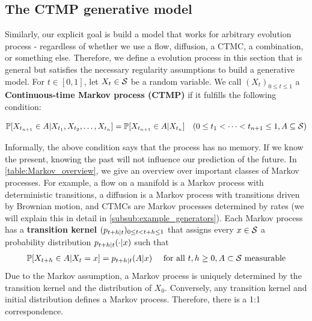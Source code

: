 \documentclass{fairmeta}
\newcommand{\highlight}[1]{{\color{metablue} \textbf{#1}}}
\numberwithin{equation}{section}
\begin{document}
\subsection{The CTMP generative model}

Similarly, our explicit goal is build a model that works for arbitrary evolution process - regardless of whether we use a flow, diffusion, a CTMC, a combination, or something else. Therefore, we define a evolution process in this section that is general but satisfies the necessary regularity assumptions to build a generative model. For $t\in [0,1]$, let $X_t\in {\mathcal{S}}$ be a random variable. We call $(X_t)_{0\leq t\leq 1}$ a \highlight{Continuous-time Markov process (CTMP)} if it fulfills the following condition:
\begin{myframe}
\begin{equation}
   \mathbb{P}[X_{t_{n+1}}\in A|X_{t_1},X_{t_2},\dots, X_{t_n}]= \mathbb{P}[X_{t_{n+1}}\in A|X_{t_n}]
   \quad (0\leq t_1<\dots<t_{n+1}\leq 1, A\subseteq {\mathcal{S}})
\end{equation}
\end{myframe}
Informally, the above condition says that the process has no memory. If we know the present, knowing the past will not influence our prediction of the future.
In \cref{table:Markov_overview}, we give an overview over important classes of Markov processes. For example, a flow on a manifold is a Markov process with deterministic transitions, a diffusion is a Markov process with transitions driven by Brownian motion, and CTMCs are Markov processes determined by rates (we will explain this in detail in \cref{subsub:example_generators}). Each Markov process has a \highlight{transition kernel} $(p_{t+h|t})_{0\leq t<t+h\leq 1}$ that assigns every $x\in {\mathcal{S}}$ a probability distribution $p_{t+h|t}(\cdot|x)$
such that 
\begin{align}
\mathbb{P}[X_{t+h}\in A|X_{t}=x]=p_{t+h|t}(A|x)\quad \text{ for all }t,h\geq 0,A\subset {\mathcal{S}}\text{ measurable}
\end{align}
Due to the Markov assumption, a Markov process is uniquely determined by the transition kernel and the distribution of $X_0$. Conversely, any transition kernel and initial distribution defines a Markov process. Therefore, there is a 1:1 correspondence.
\end{document}
